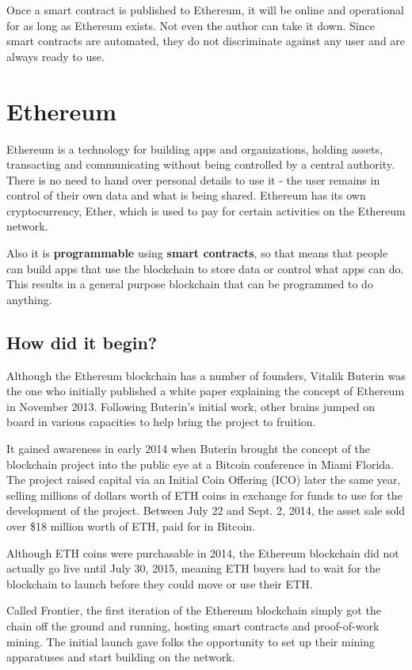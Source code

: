 \documentclass[MSE,Master,english]{twbook}%
\begin{document}
Once a smart contract is published to Ethereum, it will be online and operational for as long as Ethereum exists. Not even the author can take it down. Since smart contracts are automated, they do not discriminate against any user and are always ready to use.\cite{ethereum}

\section{Ethereum\label{eth}}
Ethereum is a technology for building apps and organizations, holding assets, transacting and communicating without being controlled by a central authority. There is no need to hand over personal details to use it - the user remains in control of their own data and what is being shared. Ethereum has its own cryptocurrency, Ether, which is used to pay for certain activities on the Ethereum network.

Also it is \textbf{programmable} using \textbf{smart contracts}, so that means that people can build apps that use the blockchain to store data or control what apps can do. This results in a general purpose blockchain that can be programmed to do anything.\cite{ethereum}

\subsection{How did it begin?}
Although the Ethereum blockchain has a number of founders, Vitalik Buterin\cite{ethHistory} was the one who initially published a white paper explaining the concept of Ethereum in November 2013. Following Buterin's initial work, other brains jumped on board in various capacities to help bring the project to fruition.

It gained awareness in early 2014 when Buterin brought the concept of the blockchain project into the public eye at a Bitcoin conference in Miami Florida. The project raised capital via an Initial Coin Offering (\gls{ICO}) later the same year, selling millions of dollars worth of ETH coins in exchange for funds to use for the development of the project. Between July 22 and Sept. 2, 2014, the asset sale sold over \$18 million worth of ETH, paid for in Bitcoin.

Although ETH coins were purchasable in 2014, the Ethereum blockchain did not actually go live until July 30, 2015, meaning ETH buyers had to wait for the blockchain to launch before they could move or use their ETH. 

Called Frontier, the first iteration of the Ethereum blockchain simply got the chain off the ground and running, hosting smart contracts and proof-of-work mining. The initial launch gave folks the opportunity to set up their mining apparatuses and start building on the network.
\end{document}
